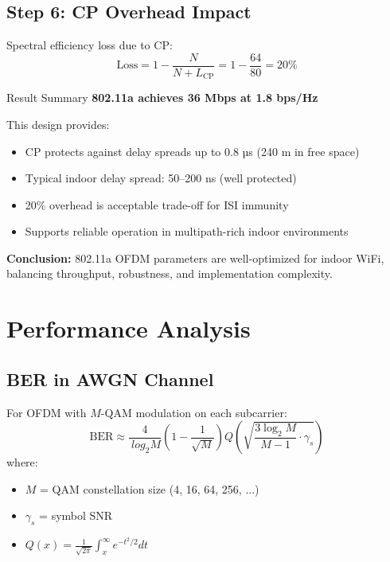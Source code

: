 \subsection*{Step 6: CP Overhead Impact}

Spectral efficiency loss due to CP:
\begin{equation}
\mathrm{Loss} = 1 - \frac{N}{N + L_{\mathrm{CP}}} = 1 - \frac{64}{80} = 20\%
\end{equation}

\begin{calloutbox}[colback=black!8!white,colframe=black]{Result Summary}
\textbf{802.11a achieves 36 Mbps at 1.8 bps/Hz}

This design provides:
\begin{itemize}
\item CP protects against delay spreads up to 0.8 µs (240 m in free space)
\item Typical indoor delay spread: 50--200 ns (well protected)
\item 20\% overhead is acceptable trade-off for ISI immunity
\item Supports reliable operation in multipath-rich indoor environments
\end{itemize}

\textbf{Conclusion:} 802.11a OFDM parameters are well-optimized for indoor WiFi, balancing throughput, robustness, and implementation complexity.
\end{calloutbox}

\section{Performance Analysis}

\subsection{BER in AWGN Channel}

For OFDM with $M$-QAM modulation on each subcarrier:
\begin{equation}
\mathrm{BER} \approx \frac{4}{\ log_2 M} \left(1 - \frac{1}{\sqrt{M}}\right) Q\left(\sqrt{\frac{3 \log_2 M}{M-1} \cdot \gamma_s}\right)
\end{equation}
where:
\begin{itemize}
\item $M$ = QAM constellation size (4, 16, 64, 256, ...)
\item $\gamma_s$ = symbol SNR
\item $Q(x) = \frac{1}{\sqrt{2\pi}}\int_x^\infty e^{-t^2/2} dt$
\end{itemize}

